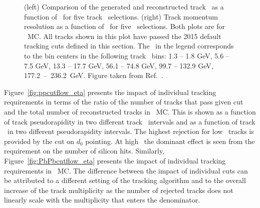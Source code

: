 \begin{figure}
\caption{(left) Comparison of the generated and reconstructed track \pt\ as a function of \etatrktruth\ for five track \pttrktruth\ selections.
(right) Track momentum resolution as a function of \etatrktruth\ for five \pttrktruth\ selections.
Both plots are for \pp\ MC.
All tracks shown in this plot have passed the 2015 default tracking cuts defined in this section.
The \pt\ in the legend corresponds to the bin centers in the following track \pt\ bins: 1.3 -- 1.8 GeV, 5.6 -- 7.5 GeV, 13.3 -- 17.7 GeV, 56.1 -- 74.8 GeV, 99.7 -- 132.9 GeV, \mbox{177.2 -- 236.2 GeV}.
Figure taken from Ref.~\cite{Sickles:2235420}.}
\label{fig:momres_pp}
\end{figure}



Figure~\ref{fig:ppcutflow_eta} presents the impact of individual tracking requirements in terms of the ratio of the number of tracks that pass given cut and the total number of reconstructed tracks in \pp\ MC.
This is shown as a function of track pseudorapidity in two different track \pT\ intervals and as a function of track \pT\ in two different pseudorapidity intervals.
The highest rejection for low \pT\ tracks is provided by the cut on $d_{0}$ pointing.
At high \pT\, the dominant effect is seen from the requirement on the number of silicon hits.
Similarly, Figure~\ref{fig:PbPbcutflow_eta} presents the impact of individual tracking requirements in \PbPb\ MC.
The difference between the impact of individual cuts can be attributed to a different setting of the tracking algorithm and to the overall increase of the track multiplicity as the number of rejected tracks does not linearly scale with the multiplicity that enters the denominator.


